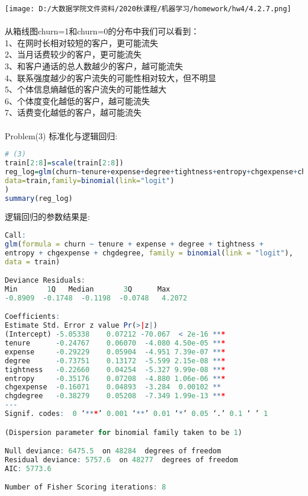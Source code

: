 \documentclass[]{article}
\begin{document}
\texttt{[image: D:/大数据学院文件资料/2020秋课程/机器学习/homework/hw4/4.2.7.png]}\\\\
从箱线图churn=1和churn=0的分布中我们可以看到：\\
1、在网时长相对较短的客户，更可能流失\\
2、当月话费较少的客户，更可能流失\\
3、和客户通话的总人数越少的客户，越可能流失\\
4、联系强度越少的客户流失的可能性相对较大，但不明显\\
5、个体信息熵越低的客户流失的可能性越大\\
6、个体度变化越低的客户，越可能流失\\
7、话费变化越低的客户，越可能流失\\\\
Problem(3) 标准化与逻辑回归:
\begin{lstlisting}[language=R]
# (3)
train[2:8]=scale(train[2:8])
reg_log=glm(churn~tenure+expense+degree+tightness+entropy+chgexpense+chgdegree,
data=train,family=binomial(link="logit")
)
summary(reg_log)
\end{lstlisting}
逻辑回归的参数结果是:
\begin{lstlisting}[language=R]
Call:
glm(formula = churn ~ tenure + expense + degree + tightness + 
entropy + chgexpense + chgdegree, family = binomial(link = "logit"), 
data = train)

Deviance Residuals: 
Min       1Q   Median       3Q      Max  
-0.8909  -0.1748  -0.1198  -0.0748   4.2072  

Coefficients:
Estimate Std. Error z value Pr(>|z|)    
(Intercept) -5.05338    0.07212 -70.067  < 2e-16 ***
tenure      -0.24767    0.06070  -4.080 4.50e-05 ***
expense     -0.29229    0.05904  -4.951 7.39e-07 ***
degree      -0.73751    0.13172  -5.599 2.15e-08 ***
tightness   -0.22660    0.04254  -5.327 9.99e-08 ***
entropy     -0.35176    0.07208  -4.880 1.06e-06 ***
chgexpense  -0.16071    0.04893  -3.284  0.00102 ** 
chgdegree   -0.38279    0.05208  -7.349 1.99e-13 ***
---
Signif. codes:  0 ‘***’ 0.001 ‘**’ 0.01 ‘*’ 0.05 ‘.’ 0.1 ‘ ’ 1

(Dispersion parameter for binomial family taken to be 1)

Null deviance: 6475.5  on 48284  degrees of freedom
Residual deviance: 5757.6  on 48277  degrees of freedom
AIC: 5773.6

Number of Fisher Scoring iterations: 8
\end{lstlisting}
\end{document}
